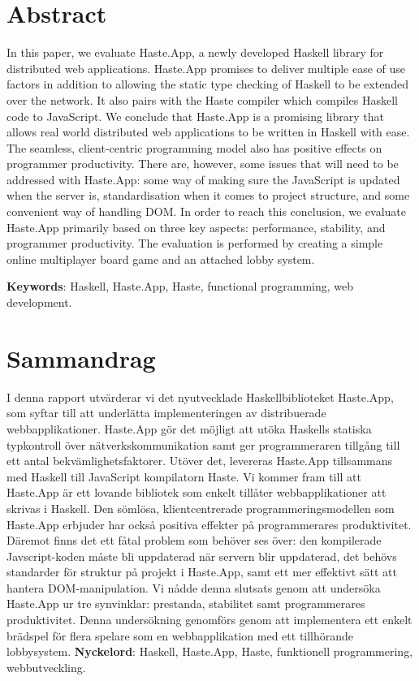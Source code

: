 \documentclass[a4paper]{article}
\begin{document}
\section*{Abstract}
In this paper, we evaluate Haste.App, a newly developed Haskell library for distributed web applications. Haste.App promises to deliver multiple ease of use factors in addition to allowing the static type checking of Haskell to be extended over the network. It also pairs with the Haste compiler which compiles Haskell code to JavaScript. We conclude that Haste.App is a promising library that allows real world distributed web applications to be written in Haskell with ease. The seamless, client-centric programming model also has positive effects on programmer productivity. There are, however, some issues that will need to be addressed with Haste.App: some way of making sure the JavaScript is updated when the server is, standardisation when it comes to project structure, and some convenient way of handling DOM. In order to reach this conclusion, we evaluate Haste.App primarily based on three key aspects: performance, stability, and programmer productivity. The evaluation is performed by creating a simple online multiplayer board game and an attached lobby system.


\vfill
\textbf{Keywords}:
Haskell, Haste.App, Haste, functional programming, web development.
\newpage


\section*{Sammandrag}
I denna rapport utvärderar vi det nyutvecklade Haskellbiblioteket Haste.App, som syftar till att underlätta implementeringen av distribuerade webbapplikationer. Haste.App gör det möjligt att utöka Haskells statiska typkontroll över nätverkskommunikation samt ger programmeraren tillgång till ett antal bekvämlighetsfaktorer. Utöver det, levereras Haste.App tillsammans med Haskell till JavaScript kompilatorn Haste. Vi kommer fram till att Haste.App är ett lovande bibliotek som enkelt tillåter webbapplikationer att skrivas i Haskell. Den sömlösa, klientcentrerade programmeringsmodellen som Haste.App erbjuder har också positiva effekter på programmerares produktivitet. Däremot finns det ett fåtal problem som behöver ses över: den kompilerade Javscript-koden måste bli uppdaterad när servern blir uppdaterad, det behövs standarder för struktur på projekt i Haste.App, samt ett mer effektivt sätt att hantera DOM-manipulation. Vi nådde denna slutsats genom att undersöka Haste.App ur tre synvinklar: prestanda, stabilitet samt programmerares produktivitet. Denna undersökning genomförs genom att implementera ett enkelt brädspel för flera spelare som en webbapplikation med ett tillhörande lobbysystem.
\vfill
\textbf{Nyckelord}:
Haskell, Haste.App, Haste, funktionell programmering, webbutveckling.
\end{document}
